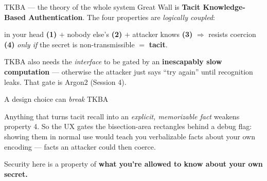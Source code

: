 \documentclass[aspectratio=169,11pt]{beamer}
\begin{document}
\begin{frame}{TKBA --- the theory of the whole system}
  Great Wall is \textbf{Tacit Knowledge-Based Authentication}. The four
  properties are \emph{logically coupled}:
  \vspace{4pt}
  \begin{center}\small
  in your head \textbf{(1)} $+$ nobody else's \textbf{(2)} $+$ attacker knows
  \textbf{(3)} \;$\Rightarrow$\; resists coercion \textbf{(4)} \emph{only if} the
  secret is non-transmissible \;$=$\; \textbf{tacit}.
  \end{center}
  \vspace{6pt}
  \begin{keyidea}
    TKBA also needs the \emph{interface} to be gated by an \textbf{inescapably
    slow computation} --- otherwise the attacker just says ``try again'' until
    recognition leaks. That gate is Argon2 (Session 4).
  \end{keyidea}
\end{frame}

\begin{frame}{A design choice can \emph{break} TKBA}
  \begin{deeper}
    Anything that turns tacit recall into an \emph{explicit, memorizable fact}
    weakens property 4. So the UX gates the bisection-area rectangles behind a
    debug flag: showing them in normal use would teach you verbalizable facts
    about your own encoding --- facts an attacker could then coerce.
  \end{deeper}
  \vspace{4pt}
  \begin{center}\small
  Security here is a property of \textbf{what you're allowed to know about your
  own secret.}
  \end{center}
\end{frame}
\end{document}
